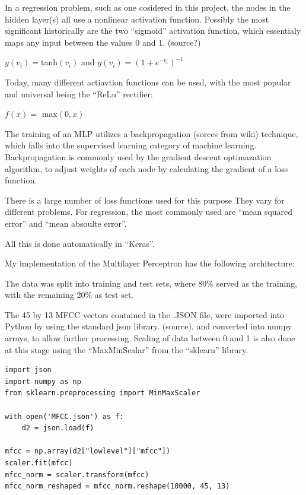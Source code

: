 In a regression problem, such as one cosidered in this project, the
nodes in the hidden layer(s) all use a nonlinear activation
function. Possibly the most significant historically are the two ``sigmoid''
activation function, which essentialy maps any input between the
values 0 and 1. (source?)

$y(v_i) =$tanh$(v_i)$ and $y(v_i) = (1+e^{-v_i})^{-1}$

Today, many different actiavtion functions can be used, with the most
popular and universal being the ``ReLu'' rectifier:

$f(x) =$ max$(0, x)$

The training of an MLP utilizes a backpropagation (sorces from wiki)
technique, which falls into the supervised learning category of
machine learning. Backpropagation is commonly used by the gradient
descent optimazation algorithm, to adjust weights of each node by
calculating the gradient of a loss function.

There is a large number of loss functions used for this purpose They
vary for different problems. For regression, the most commonly used
are ``mean squared error'' and ``mean absoulte error''.

All this is done automatically in ``Keras''.

My implementation of the Multilayer Perceptron has the following
architecture:


The data was split into training and test sets, where 80\% served as
the training, with the remaining 20\% as test set.

The 45 by 13 MFCC vectors contained in the .JSON file, were imported
into Python by using the standard json library. (source), and
converted into numpy arrays, to allow further processing. Scaling of
data between 0 and 1 is also done at this stage using the
``MaxMinScalar'' from the ``sklearn'' library.
\begin{lstlisting}
import json
import numpy as np
from sklearn.preprocessing import MinMaxScaler

with open('MFCC.json') as f:
    d2 = json.load(f)

mfcc = np.array(d2["lowlevel"]["mfcc"])
scaler.fit(mfcc)
mfcc_norm = scaler.transform(mfcc)
mfcc_norm_reshaped = mfcc_norm.reshape(10000, 45, 13)
\end{lstlisting}

